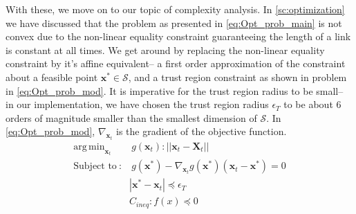 \documentclass[12pt,a4]{article}
\DeclareMathOperator*{\argmin}{arg\,min}
\begin{document}
With these, we move on to our topic of complexity analysis. In \cref{sc:optimization} we have discussed that the problem as presented in \cref{eq:Opt_prob_main} is not  convex due to the non-linear equality constraint guaranteeing the length of a link is constant at all times. We get around by replacing the non-linear equality constraint by it's affine equivalent-- a first order approximation of the constraint about a feasible point $\textbf{x}^* \in \mathcal{S}$, and a trust region constraint as shown in problem in \cref{eq:Opt_prob_mod}. It is imperative for the trust region radius to be small-- in our implementation, we have chosen the trust region radius $\epsilon_T$ to be about 6 orders of magnitude smaller than the smallest dimension of $\mathcal{S}$. In \cref{eq:Opt_prob_mod}, $\nabla_{\textbf{x}_t}$ is the gradient of the objective function. 
\begin{align}\label{eq:Opt_prob_mod}
 \argmin_{\textbf{x}_t} & ~g(\textbf{x}_t): \vert \vert \textbf{x}_t-\textbf{X}_t\vert \vert\\
\text{Subject to}~: &~ g(\textbf{x}^*)-\nabla_{\textbf{x}_t}g(\textbf{x}^*) (\textbf{x}_t-\textbf{x}^*) =0\nonumber\\ 
					& | \textbf{x}^*-\textbf{x}_t| \preceq  \epsilon_T \nonumber\\
					& C_{ineq}: f(x) \preceq 0 \nonumber
\end{align}
\end{document}

